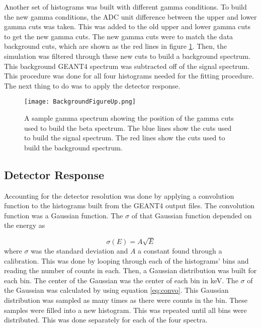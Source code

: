 \documentclass[../MaxHughesThesis.tex]{subfiles}
\begin{document}
Another set of histograms was built with different gamma conditions.
To build the new gamma conditions, the ADC unit difference between the upper and lower gamma cuts was taken.
This was added to the old upper and lower gamma cuts to get the new gamma cuts.
The new gamma cuts were to match the data background cuts, which are shown as the red lines in figure \ref{fig:backgroundsubbeta}. 
Then, the simulation was filtered through these new cuts to build a background spectrum.
This background GEANT4 spectrum was subtracted off of the signal spectrum.
This procedure was done for all four histograms needed for the fitting procedure.
The next thing to do was to apply the detector response. 

\begin{figure}[!htb]
        \centerline{\texttt{[image: BackgroundFigureUp.png]}}
        \caption{A sample gamma spectrum showing the position of the gamma cuts used to build the beta spectrum.
		 The blue lines show the cuts used to build the signal spectrum.
		 The red lines show the cuts used to build the background spectrum.
                   }
        \label{fig:backgroundsubbeta}
\end{figure}
\subsection{Detector Response}
\label{sec:convolution}
Accounting for the detector resolution was done by applying a convolution function to the histograms built from the GEANT4 output files.
The convolution function was a Gaussian function. 
The $\sigma$ of that Gaussian function depended on the energy as

\begin{equation}
	\sigma(E) = A\sqrt{E}
	\label{eq:convo}
\end{equation}
where $\sigma$ was the standard deviation and $A$ a constant found through a calibration.
This was done by looping through each of the histograms' bins and reading the number of counts in each.
Then, a Gaussian distribution was built for each bin.
The center of the Gaussian was the center of each bin in keV.
The $\sigma$ of the Gaussian was calculated by using equation \ref{eq:convo}.
This Gaussian distribution was sampled as many times as there were counts in the bin.
These samples were filled into a new histogram.
This was repeated until all bins were distributed.
This was done separately for each of the four spectra. 
\end{document}
